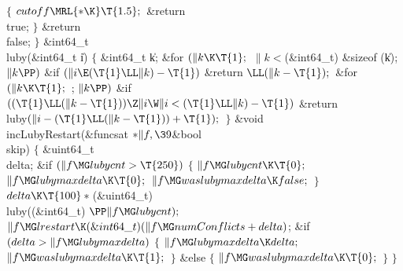 {{{{{${}\{{}$\1\6
${}\\{cutoff}\MRL{*{\K}}\T{1.5};{}$\6
\&{return} \\{true};\6
\4${}\}{}$\2\6
\&{return} \\{false};\6
\4${}\}{}$\2\7
\&{int64\_t} \\{luby}(\&{int64\_t} \|i)\1\1\2\2\6
${}\{{}$\1\6
\&{int64\_t} \|k;\7
\&{for} ${}(\|k\K\T{1};{}$ ${}\|k<{}$(\&{int64\_t}) \&{sizeof} (\|k); ${}\|k%
\PP){}$\1\6
\&{if} ${}(\|i\E(\T{1}\LL\|k)-\T{1}){}$\1\5
\&{return} ${}\LL(\|k-\T{1});{}$\2\2\6
\&{for} ${}(\|k\K\T{1};{}$  ; ${}\|k\PP){}$\1\6
\&{if} ${}((\T{1}\LL(\|k-\T{1}))\Z\|i\W\|i<(\T{1}\LL\|k)-\T{1}){}$\1\5
\&{return} \\{luby}${}(\|i-(\T{1}\LL(\|k-\T{1}))+\T{1});{}$\2\2\6
\4${}\}{}$\2\7
\&{void} \\{incLubyRestart}(\&{funcsat} ${}{*}\|f,\39{}$\&{bool} \\{skip})\1\1%
\2\2\6
${}\{{}$\1\6
\&{uint64\_t} \\{delta};\7
\&{if} ${}(\|f\MG\\{lubycnt}>\T{250}){}$\5
${}\{{}$\1\6
${}\|f\MG\\{lubycnt}\K\T{0};{}$\6
${}\|f\MG\\{lubymaxdelta}\K\T{0};{}$\6
${}\|f\MG\\{waslubymaxdelta}\K\\{false};{}$\6
\4${}\}{}$\2\6
${}\\{delta}\K\T{100}*{}$(\&{uint64\_t}) \\{luby}((\&{int64\_t}) ${}\PP\|f\MG%
\\{lubycnt});{}$\6
${}\|f\MG\\{lrestart}\K(\&{int64\_t})(\|f\MG\\{numConflicts}+\\{delta}){}$;\6
\&{if} ${}(\\{delta}>\|f\MG\\{lubymaxdelta}){}$\5
${}\{{}$\1\6
${}\|f\MG\\{lubymaxdelta}\K\\{delta};{}$\6
${}\|f\MG\\{waslubymaxdelta}\K\T{1};{}$\6
\4${}\}{}$\2\6
\&{else}\5
${}\{{}$\1\6
${}\|f\MG\\{waslubymaxdelta}\K\T{0};{}$\6
\4${}\}{}$\2\6
\4${}\}{}$\2\par
\fi

}}}}}
